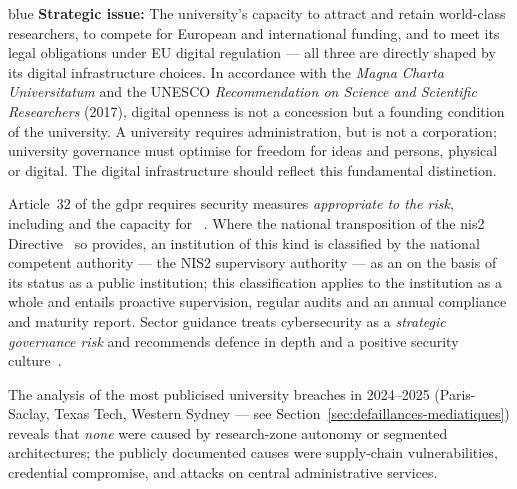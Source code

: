 \begin{stakeholderbox}{blue}
\textbf{Strategic issue:} The university's capacity to attract
and retain world-class researchers, to compete for European and
international funding, and to meet its legal obligations under
EU digital regulation --- all three are directly shaped by its
digital infrastructure choices. In accordance with the
\emph{Magna Charta Universitatum} and the UNESCO \emph{Recommendation
on Science and Scientific Researchers} (2017), digital openness is not
a concession but a founding condition of the university.
A university requires administration, but is not a corporation;
university governance must optimise for freedom for ideas and persons,
physical or digital. The digital infrastructure should reflect this
fundamental distinction.

\medskip
Article~32 of the \gls{gdpr} requires security measures \emph{appropriate to
the risk}, including  and the capacity for
~\cite{gdpr}. Where the national transposition of
the \gls{nis2} Directive~\cite{nis2} so provides, an institution of this kind is classified
by the national competent authority --- the NIS2 supervisory authority --- as an
 on the basis of its status as a public
institution; this classification applies to the institution as a whole
and entails proactive supervision, regular audits and an annual
compliance and maturity report. Sector guidance
treats cybersecurity as a \emph{strategic governance risk} and
recommends defence in depth and a positive security
culture~\cite{jisc-guidance}.

\medskip
The analysis of the most publicised university breaches in
2024--2025 (Paris-Saclay, Texas Tech, Western Sydney ---
see Section~\ref{sec:defaillances-mediatiques}) reveals that
\emph{none} were caused by research-zone autonomy or segmented
architectures; the publicly documented causes were supply-chain
vulnerabilities, credential compromise, and attacks on central
administrative services.


\end{stakeholderbox}
